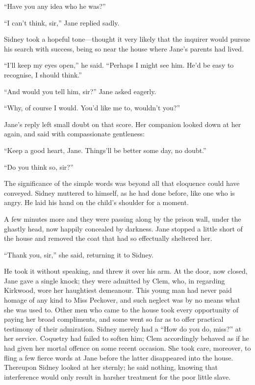 ``Have you any idea who he was?''

``I can't think, sir,'' Jane replied sadly.

{}Sidney took a hopeful tone---thought it very likely that the inquirer
would pursue his search with success, being so near the house where
Jane's parents had lived.

``I'll keep my eyes open,'' he said. ``Perhaps I might see him. He'd be
easy to recognise, I should think.''

``And would you tell him, sir?'' Jane asked eagerly.

``Why, of course I would. You'd like me to, wouldn't you?''

Jane's reply left small doubt on that score. Her companion looked down
at her again, and said with compassionate gentleness:

``Keep a good heart, Jane. Things'll be better some day, no doubt.''

``Do you think so, sir?''

The significance of the simple words was beyond all that eloquence could
have conveyed. Sidney muttered to himself, as he had done before, like
one who is angry. He laid his hand on the child's shoulder for a moment.

A few minutes more and they were passing {}along by the prison wall,
under the ghastly head, now happily concealed by darkness. Jane stopped
a little short of the house and removed the coat that had so effectually
sheltered her.

``Thank you, sir,'' she said, returning it to Sidney.

He took it without speaking, and threw it over his arm. At the door, now
closed, Jane gave a single knock; they were admitted by Clem, who, in
regarding Kirkwood, wore her haughtiest demeanour. This young man had
never paid homage of any kind to Miss Peckover, and such neglect was by
no means what she was used to. Other men who came to the house took
every opportunity of paying her broad compliments, and some went so far
as to offer practical testimony of their admiration. Sidney merely had a
``How do you do, miss?'' at her service. Coquetry had failed to soften
him; Clem accordingly behaved as if he had given her mortal offence on
some recent occasion. She took care, moreover, to fling a few fierce
words at Jane {}before the latter disappeared into the house. Thereupon
Sidney looked at her sternly; he said nothing, knowing that interference
would only result in harsher treatment for the poor little slave.

